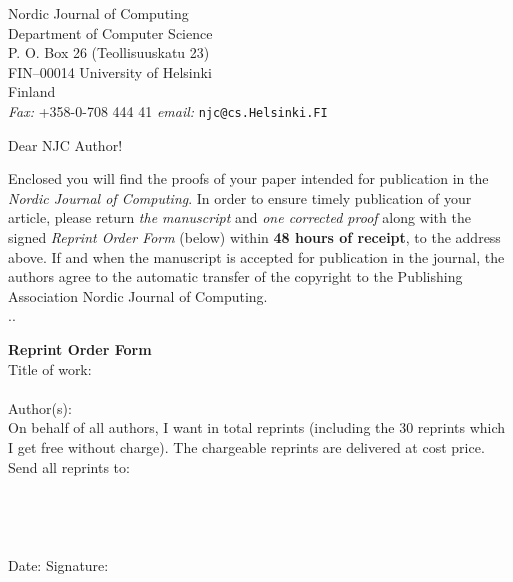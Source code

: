 \setlength{\textwidth}{16.5cm}
\setlength{\textheight}{25cm}
\setlength{\oddsidemargin}{0cm}
\setlength{\topmargin}{-2cm}

\pagestyle{empty}
\noindent
\large
{\sc Nordic Journal of Computing}\\
\normalsize
Department of Computer Science\\
P. O. Box 26 (Teollisuuskatu 23)\\
FIN--00014 University of Helsinki\\
Finland\\
{\em Fax:} +358-0-708 444 41 {\em email:} {\tt njc@cs.Helsinki.FI}\\ \bigskip

\noindent
Dear NJC Author!
\smallskip

Enclosed you will find the proofs of your paper intended for publication in the {\em Nordic Journal of Computing}. In order to ensure timely publication of your article, please return {\em the manuscript} and {\em one corrected proof} along with the signed {\em Reprint Order
Form} (below) within {\bf 48 hours of receipt}, to the address above.
If and when the manuscript is accepted for publication in the journal, the authors
agree to the automatic transfer of the copyright to the Publishing Association Nordic Journal of Computing.\\ 

\bigskip
\noindent
.\dotfill.\\
\bigskip

\noindent
{\bf Reprint Order Form}
\smallskip\\

Title of work: \underline{\hspace{13cm}} \vspace{3mm}\\
\underline{\hspace{16cm}}\vspace{3mm}\\
Author(s): \underline{\hspace{14.1cm}}
\smallskip\\

On behalf of all authors, I want in total \underline{\hspace{1.5cm}} reprints (including the
30 reprints which I get free without charge). The chargeable reprints
are delivered at cost price.
\bigskip\\
Send all reprints to:
\underline{\hspace{12.3cm}}\\
\hspace*{3cm} \underline{\hspace{13cm}}\\ \hspace*{3cm} \underline{\hspace{13cm}}\\ \hspace*{3cm} \underline{\hspace{13cm}}\\ \hspace*{3cm} \underline{\hspace{13cm}}\\ 

\bigskip
\noindent
Date: \underline{\hspace{3cm}} Signature: \underline{\hspace{9.5cm}}\\ \smallskip



